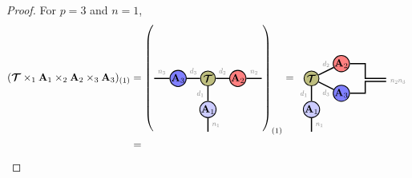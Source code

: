 \begin{proof}
For $p =3$ and $n=1$,
\begin{align*}
(\Tt\ttm1\Ab_1\ttm2\Ab_2\ttm3\Ab_3)_{(1)}
&= 
 \left(\begin{tikzpicture}[baseline=-0.5ex]
    \tikzset{tensor/.style = {minimum size = 0.5cm,shape = circle,thick,draw=black,inner sep = 0pt}, edge/.style = {thick,line width=.4mm},every loop/.style={}}
    \def\x{6}
    \node[tensor,fill=blue!20!white] (A1) at (\x,-1.05) {$\Ab_1$};
    \node[tensor,fill=green!50!red!50!white] (At) at (\x,0) {$\Tt$};
    \node[tensor,fill=red!50!white] (A2) at (\x+1,0) {$\Ab_2$};
    \node[tensor,fill=blue!50!white] (A3) at (\x-1,0) {$\Ab_3$};
    \draw[edge] (At) -- (A2) node [midway,above] {\scalebox{0.7}{\dimcolor{$d_2$}}};
    \draw[edge] (At) -- (A1) node [midway,left] {\scalebox{0.7}{\dimcolor{$d_1$}}};
    \draw[edge] (At) -- (A3) node [midway,above] {\scalebox{0.7}{\dimcolor{$d_3$}}};
    \draw[edge] (A1) -- (\x,-1.8) node [midway,right] {\scalebox{0.7}{\dimcolor{$n_1$}}};
    \draw[edge] (A2) -- (\x+1.8,0) node [midway,above] {\scalebox{0.7}{\dimcolor{$n_2$}}};
    \draw[edge] (A3) -- (\x-1.8,0) node [midway,above] {\scalebox{0.7}{\dimcolor{$n_3$}}};
    \end{tikzpicture}\right)_{(1)}
=
\begin{tikzpicture}[baseline=-0.5ex]
    \tikzset{tensor/.style = {minimum size = 0.5cm,shape = circle,thick,draw=black,inner sep = 0pt}, edge/.style = {thick,line width=.4mm},every loop/.style={}}
    \def\x{6}
    \def\y{0}
    \node[tensor,fill=blue!20!white] (A1) at (\x,-1.05) {$\Ab_1$};
    \node[tensor,fill=green!50!red!50!white] (At) at (\x,0) {$\Tt$};
    \node[tensor,fill=red!50!white] (A2) at (\x+1,\y+0.5) {$\Ab_2$};
    \node[tensor,fill=blue!50!white] (A3) at (\x+1,\y-0.5) {$\Ab_3$};
    \draw[edge] (At) -- (A1) node [midway,left] {\scalebox{0.7}{\dimcolor{$d_1$}}};
    \draw[edge] (At) -- (A3) node [midway,below] {\scalebox{0.7}{\dimcolor{$d_3$}}};
    \draw[edge] (At) -- (A2) node [midway,above] {\scalebox{0.7}{\dimcolor{$d_2$}}};
    \draw[edge] (A1) -- (\x,-1.8) node [midway,right] {\scalebox{0.7}{\dimcolor{$n_1$}}};
    \draw[edge] (A2) -- (\x+1.8,\y+0.5) -- (\x+1.8,\y)-- (\x+2.5,\y);
    \draw[edge] (A3) -- (\x+1.8,\y-0.5) -- (\x+1.8,\y-0.1) -- (\x+2.5,\y-0.1)node [right] {\scalebox{0.7}{\dimcolor{$n_2n_3$}}};
    \end{tikzpicture}\\
&=
\begin{tikzpicture}[baseline=-0.5ex]
    \tikzset{tensor/.style = {minimum size = 0.5cm,shape = circle,thick,draw=black,inner sep = 0pt}, edge/.style = {thick,line width=.4mm},every loop/.style={}}

\end{tikzpicture}
\end{align*}
\end{proof}
